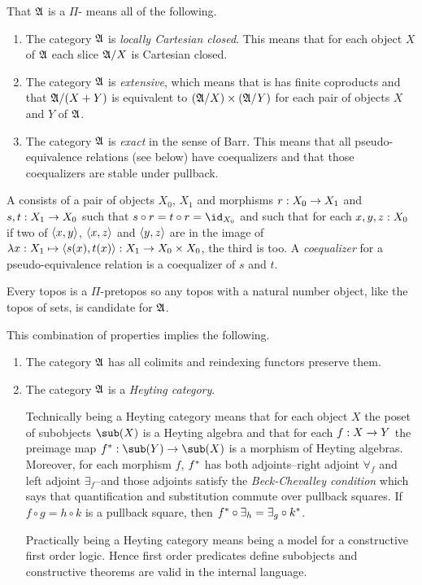 \documentclass[csh.tex]{subfiles}
\begin{document}
\begin{definition} 
That $\mathfrak A$ is a $\Pi$- means all of the following.

\begin{enumerate}
\item The category $\mathfrak A$ is \emph{locally Cartesian closed}. This means that for each object $X$ of $\mathfrak A$ each slice $\mathfrak A/X$ is Cartesian closed.
\item The category $\mathfrak A$ is \emph{extensive}, which means that is has finite coproducts and that $\mathfrak A/(X+Y)$ is equivalent to $(\mathfrak A/X)\times(\mathfrak A/Y)$ for each pair of objects $X$ and $Y$ of $\mathfrak A$.
\item The category $\mathfrak A$ is \emph{exact} in the sense of Barr. This means that all pseudo-equivalence relations (see below) have coequalizers and that those coequalizers are stable under pullback.
\end{enumerate}

A  consists of a pair of objects $X_0$, $X_1$ and morphisms $r: X_0\to X_1$ and $s,t: X_1\to X_0$ such that $s\circ r= t\circ r = \id_{X_0}$ and such that for each $x,y,z: X_0$ if two of $\left\langle x,y \right\rangle$, $\left\langle x,z \right\rangle$ and $\left\langle y,z \right\rangle$ are in the image of $\lambda x: X_1 \mapsto{\left\langle s(x),t(x) \right\rangle}: X_1\to X_0\times X_0$, the third is too. A \emph{coequalizer} for a pseudo-equivalence relation is a coequalizer of $s$ and $t$.
\end{definition}

\begin{example} Every topos is a $\Pi$-pretopos so any topos with a natural number object, like the topos of sets, is candidate for $\mathfrak A$. \end{example}

This combination of properties implies the following.
\begin{enumerate}
\item The category $\mathfrak A$ has all colimits and reindexing functors preserve them. 
\item The category $\mathfrak A$ is a \emph{Heyting category}. 

Technically being a Heyting category means that for each object $X$ the poset of subobjects $\sub(X)$ is a Heyting algebra and that for each $f: X\to Y$ the preimage map $f\ri\of\sub(Y)\to\sub(X)$ is a morphism of Heyting algebras. Moreover, for each morphism $f$, $f^*$ has both adjoints--right adjoint $\forall_f$ and left adjoint $\exists_f$--and those adjoints satisfy the \emph{Beck-Chevalley condition} which says that quantification and substitution commute over pullback squares. If $f\circ g = h\circ k$ is a pullback square, then $f^*\circ\exists_h=\exists_g\circ k^*$.

Practically being a Heyting category means being a model for a constructive first order logic. Hence first order predicates define subobjects and constructive theorems are valid in the internal language.
\end{enumerate}
\end{document}

